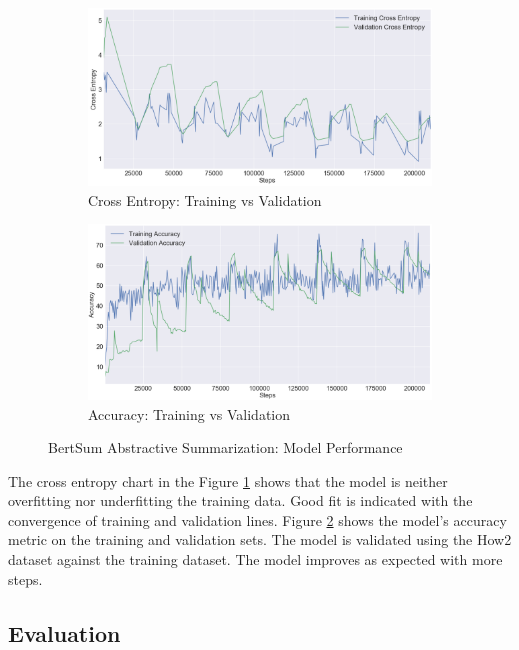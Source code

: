 \documentclass{article}
\begin{document}
\begin{figure}[H]
\begin{subfigure}{.5\textwidth}
  \centering
  \includegraphics[width=\linewidth]{xent.png}
  \caption{Cross Entropy: Training vs Validation}
  \label{fig:xent}
\end{subfigure}%
\begin{subfigure}{.5\textwidth}
  \centering
  \includegraphics[width=\linewidth]{accuracy.png}
  \caption{Accuracy: Training vs Validation}
  \label{fig:accuracy}
\end{subfigure}
\caption{BertSum Abstractive Summarization: Model Performance}
\label{fig:modelperf}
\end{figure}

The cross entropy chart  in the Figure \ref{fig:xent} shows that the model is neither overfitting nor underfitting the training data. Good fit is indicated with the convergence of training and validation lines. Figure \ref{fig:accuracy} shows the model’s accuracy metric on the training and validation sets. The model is validated using the How2 dataset against the training dataset. The model improves as expected with more steps.

\subsection{Evaluation}
\end{document}
